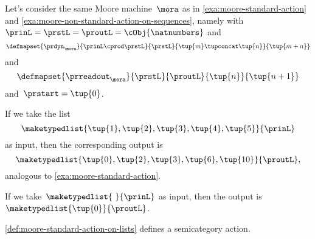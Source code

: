 \begin{example}
    \label{exa:moore-non-standard-action-on-lists}
    Let's consider the same Moore machine~$\mora$ as in \cref{exa:moore-standard-action} and \cref{exa:moore-non-standard-action-on-sequences}, namely with~$\prinL = \prstL = \proutL = \cObj{\natnumbers}$
    and
    \begin{equation}
        \defmapset{
            \prdyn_\mora
        }{
            \prinL \cprod \prstL
        }{
            \prstL
        }{
            \tup{m} \tupconcat \tup{n}
        }{
            \tup{m + n}
        }
    \end{equation}
    and
    \begin{equation}
        \defmapset{
            \prreadout_\mora
        }{
            \prstL
        }{
            \proutL
        }{
            \tup{n}
        }{
            \tup{n+1}
        }
    \end{equation}
    and~$\prstart = \tup{0}$.

    If we take the list
    \begin{equation*}
        \maketypedlist{\tup{1}, \tup{2}, \tup{3}, \tup{4}, \tup{5}}{\prinL}
    \end{equation*}
    as input, then the corresponding output is
    \begin{equation*}
        \maketypedlist{\tup{0}, \tup{2}, \tup{3}, \tup{6}, \tup{10}}{\proutL},
    \end{equation*}
    analogous to \cref{exa:moore-standard-action}.

    If we take~$\maketypedlist{\ }{\prinL}$ as input, then the output is~$\maketypedlist{\tup{0}}{\proutL}$.
\end{example}


\begin{lemma}
    \cref{def:moore-standard-action-on-lists} defines a semicategory action.
\end{lemma}


